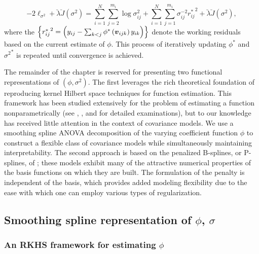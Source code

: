 \documentclass[12pt]{article}
\newcommand{\bfv}{\mbox{\boldmath $v$}}
\theoremstyle{definition}
\begin{document}
\begin{equation} \label{eq:penalized-joint-loglik-given-phi}
-2\ell_{\sigma^2} + \breve{\lambda} \breve{J}\left(\sigma^2\right) = \sum_{i=1}^N \sum_{j=2}^{m_i} \log \sigma^2_{ij} + \sum_{i=1}^N \sum_{j=1}^{m_i} \sigma_{ij}^{-2} {r_{ij}^*}^2 + \breve{\lambda} \breve{J}\left(\sigma^2 \right),
\end{equation}
where the $\left\{{r_{ij}^*}^2  =\left( y_{ij} - \sum_{k<j} \phi^*\left(\bfv_{ijk}\right) y_{ik}  \right)\right\}$ denote the working residuals based on the current estimate of $\phi$. This process of iteratively updating $\phi^*$ and ${\sigma^2}^*$ is repeated until convergence is achieved. 
\bigskip

The remainder of the chapter is reserved for presenting two functional representations of $\left(\phi, \sigma^2\right)$. The first leverages the rich theoretical foundation of reproducing kernel Hilbert space techniques for function estimation. This framework has been studied extensively for the problem of estimating a function nonparametrically (see \citet{aronszajn1950theory}, \citet{wahba1990spline}, and \citet{berlinet2011reproducing} for detailed examinations), but to our knowledge has received little attention in the context of covariance models. We use a smoothing spline ANOVA decomposition of the varying coefficient function $\phi$ to construct a flexible class of covariance models while simultaneously maintaining interpretability. The second approach is based on the penalized B-splines, or P-splines, of \citet{eilers1996flexible}; these models exhibit many of the attractive numerical properties of the basis functions on which they are built. The formulation of the penalty is independent of the basis, which provides added modeling flexibility due to the ease with which one can employ various types of regularization.



\subsection{Smoothing spline representation of $\phi$, $\sigma$}


\subsubsection{An RKHS framework for estimating $\phi$}

\end{document}
